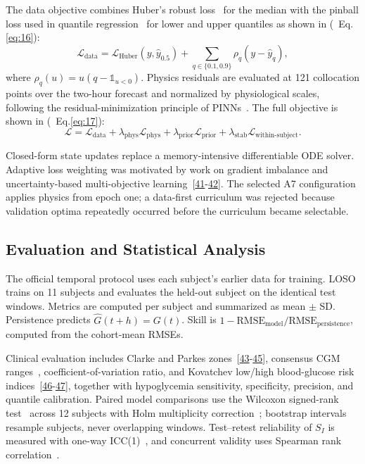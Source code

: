\documentclass[journal]{IEEEtran}
\begin{document}
The data objective combines Huber's robust loss~\cite{ref39} for the median with the pinball loss used in quantile regression~\cite{ref40} for lower and upper quantiles as shown in (\ Eq.\eqref{eq:16}):
\begin{equation}
\mathcal{L}_{\text{data}} = \mathcal{L}_{\text{Huber}}(y, \hat{y}_{0.5}) + \sum_{q \in \{0.1, 0.9\}} \rho_q(y - \hat{y}_q),
\label{eq:16}
\end{equation}
where $\rho_q(u) = u(q - \mathbb{1}_{u<0})$. Physics residuals are evaluated at 121 collocation points over the two-hour forecast and normalized by physiological scales, following the residual-minimization principle of PINNs~\cite{ref8}. The full objective is shown in (\ Eq.\eqref{eq:17}):
\begin{equation}
\mathcal{L} = \mathcal{L}_{\text{data}} + \lambda_{\text{phys}} \mathcal{L}_{\text{phys}} + \lambda_{\text{prior}} \mathcal{L}_{\text{prior}} + \lambda_{\text{stab}} \mathcal{L}_{\text{within-subject}}.
\label{eq:17}
\end{equation}

Closed-form state updates replace a memory-intensive differentiable ODE solver. Adaptive loss weighting was motivated by work on gradient imbalance and uncertainty-based multi-objective learning~[\hyperref[ref41label]{41}-\hyperref[ref42label]{42}]. The selected A7 configuration applies physics from epoch one; a data-first curriculum was rejected because validation optima repeatedly occurred before the curriculum became selectable.

\subsection{Evaluation and Statistical Analysis}

The official temporal protocol uses each subject's earlier data for training. LOSO trains on 11 subjects and evaluates the held-out subject on the identical test windows. Metrics are computed per subject and summarized as mean $\pm$ SD\@. Persistence predicts $\hat{G}(t+h) = G(t)$. Skill is $1 - \text{RMSE}_{\text{model}}/\text{RMSE}_{\text{persistence}}$, computed from the cohort-mean RMSEs.

Clinical evaluation includes Clarke and Parkes zones~[\hyperref[ref43label]{43}-\hyperref[ref45label]{45}], consensus CGM ranges~\cite{ref52}, coefficient-of-variation ratio, and Kovatchev low/high blood-glucose risk indices~[\hyperref[ref46label]{46}-\hyperref[ref47label]{47}], together with hypoglycemia sensitivity, specificity, precision, and quantile calibration. Paired model comparisons use the Wilcoxon signed-rank test~\cite{ref48} across 12 subjects with Holm multiplicity correction~\cite{ref49}; bootstrap intervals resample subjects, never overlapping windows. Test--retest reliability of $S_I$ is measured with one-way ICC(1)~\cite{ref50}, and concurrent validity uses Spearman rank correlation~\cite{ref51}.
\end{document}
